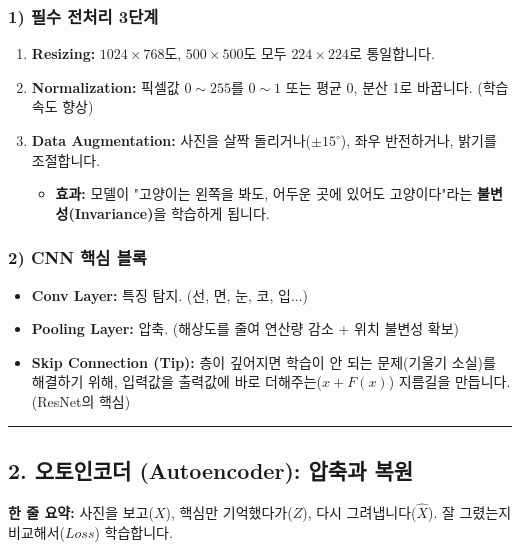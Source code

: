 \documentclass[11pt,a4paper]{book}
\theoremstyle{definition}
\begin{document}
\subsubsection*{1) 필수 전처리 3단계}
\begin{enumerate}
    \item \textbf{Resizing:} $1024 \times 768$도, $500 \times 500$도 모두 $224 \times 224$로 통일합니다.
    \item \textbf{Normalization:} 픽셀값 $0 \sim 255$를 $0 \sim 1$ 또는 평균 0, 분산 1로 바꿉니다. (학습 속도 향상)
    \item \textbf{Data Augmentation:} 사진을 살짝 돌리거나($\pm 15^\circ$), 좌우 반전하거나, 밝기를 조절합니다.
    \begin{itemize}
        \item \textbf{효과:} 모델이 "고양이는 왼쪽을 봐도, 어두운 곳에 있어도 고양이다"라는 \textbf{불변성(Invariance)}을 학습하게 됩니다.
    \end{itemize}
\end{enumerate}

\subsubsection*{2) CNN 핵심 블록}

\begin{itemize}
    \item \textbf{Conv Layer:} 특징 탐지. (선, 면, 눈, 코, 입...)
    \item \textbf{Pooling Layer:} 압축. (해상도를 줄여 연산량 감소 + 위치 불변성 확보)
    \item \textbf{Skip Connection (Tip):} 층이 깊어지면 학습이 안 되는 문제(기울기 소실)를 해결하기 위해, 입력값을 출력값에 바로 더해주는($x + F(x)$) 지름길을 만듭니다. (ResNet의 핵심)
\end{itemize}

\vspace{0.5cm}\hrule\vspace{0.5cm}

\subsection{2. 오토인코더 (Autoencoder): 압축과 복원}


\begin{conceptbox}[title={개념 2: 기억해서 그려보기}]
\textbf{한 줄 요약:} 사진을 보고($X$), 핵심만 기억했다가($Z$), 다시 그려냅니다($\hat{X}$). 잘 그렸는지 비교해서($Loss$) 학습합니다.
\end{conceptbox}
\end{document}
